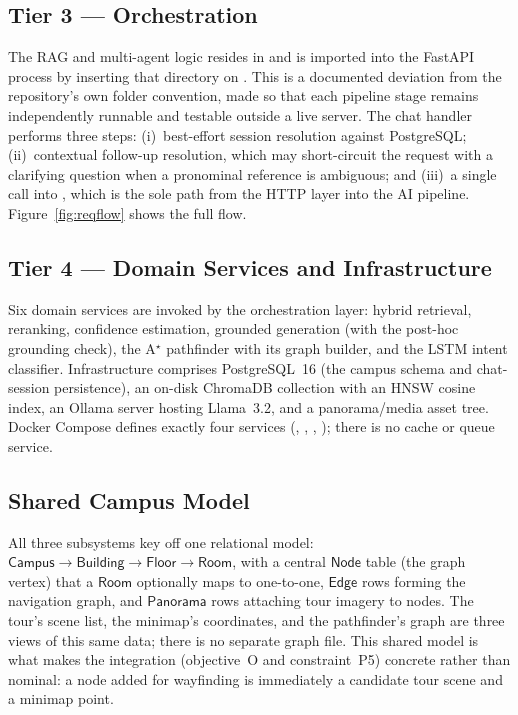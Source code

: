 \subsection{Tier 3 --- Orchestration}
The RAG and multi-agent logic resides in  and is imported
into the FastAPI process by inserting that directory on .
This is a documented deviation from the repository's own folder convention,
made so that each pipeline stage remains independently runnable and
testable outside a live server. The chat handler performs three steps:
(i)~best-effort session resolution against PostgreSQL; (ii)~contextual
follow-up resolution, which may short-circuit the request with a clarifying
question when a pronominal reference is ambiguous; and (iii)~a single call
into , which is the sole path from the HTTP layer
into the AI pipeline. Figure~\ref{fig:reqflow} shows the full flow.

\subsection{Tier 4 --- Domain Services and Infrastructure}
Six domain services are invoked by the orchestration layer: hybrid
retrieval, reranking, confidence estimation, grounded generation (with the
post-hoc grounding check), the A$^{\star}$ pathfinder with its graph
builder, and the LSTM intent classifier. Infrastructure comprises
PostgreSQL~16 (the campus schema and chat-session persistence), an
on-disk ChromaDB collection with an HNSW cosine index, an Ollama server
hosting Llama~3.2, and a panorama/media asset tree. Docker Compose defines
exactly four services (, , ,
); there is no cache or queue service.

\subsection{Shared Campus Model}
All three subsystems key off one relational model:
$\textsf{Campus}\!\rightarrow\!\textsf{Building}\!\rightarrow\!\textsf{Floor}\!\rightarrow\!\textsf{Room}$,
with a central $\textsf{Node}$ table (the graph vertex) that a $\textsf{Room}$
optionally maps to one-to-one, $\textsf{Edge}$ rows forming the navigation
graph, and $\textsf{Panorama}$ rows attaching tour imagery to nodes. The
tour's scene list, the minimap's coordinates, and the pathfinder's graph
are three views of this same data; there is no separate graph file. This
shared model is what makes the integration (objective~O and constraint~P5)
concrete rather than nominal: a node added for wayfinding is immediately a
candidate tour scene and a minimap point.

